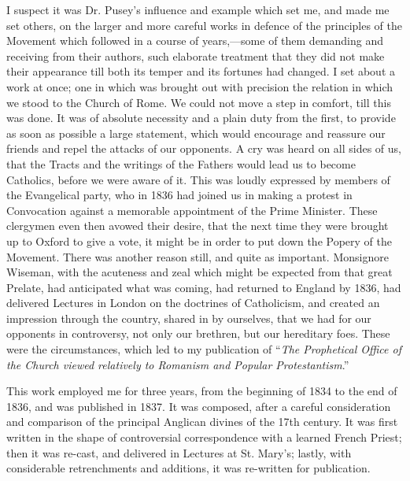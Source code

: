 I suspect it was Dr. Pusey's influence and example which set me, and
made me set others, on the larger and more careful works in defence of
the principles of the Movement which followed in a course of years,—some
of them demanding and receiving from their authors, such elaborate
treatment that they did not make their appearance till both its temper
and its fortunes had changed. I set about a work at once; one in which
was brought out with precision the relation in which we stood to the
Church of Rome. We could not move a step in comfort, till this was done.
It was of absolute necessity and a plain duty from the first, to
provide as soon as possible a large statement, which would encourage and
reassure our friends and repel the attacks of our opponents. A cry was
heard on all sides of us, that the Tracts and the writings of the
Fathers would lead us to become Catholics, before we were aware of it.
This was loudly expressed by members of the Evangelical party, who in
1836 had joined us in making a protest in Convocation against a
memorable appointment of the Prime Minister. These clergymen even then
avowed their desire, that the next time they were brought up to Oxford
to give a vote, it might be in order to put down the Popery of the
Movement. There was another reason still, and quite as important.
Monsignore Wiseman, with the acuteness and zeal which might be expected
from that great Prelate, had anticipated what was coming, had returned
to England by 1836, had delivered Lectures in London on the
doctrines of Catholicism, and created an impression through the country,
shared in by ourselves, that we had for our opponents in controversy,
not only our brethren, but our hereditary foes. These were the
circumstances, which led to my publication of ``\emph{The Prophetical
Office of the Church viewed relatively to Romanism and Popular
Protestantism}.''

This work employed me for three years, from the beginning of 1834 to
the end of 1836, and was published in 1837. It was composed,
after a careful consideration and comparison of the principal Anglican
divines of the 17th century. It was first written in the
shape of controversial correspondence with a learned French Priest; then
it was re-cast, and delivered in Lectures at St. Mary's; lastly, with
considerable retrenchments and additions, it was re-written for
publication.


